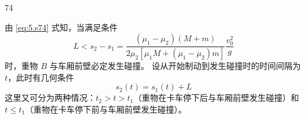 \begin{solution}{74}
\begin{subsolution}
    \end{subsolution}
    \begin{subsolution}
        由 \eqref{eq:5.s74} 式知，当满足条件
        \begin{equation}
            L < s_{2} - s_{1} = \frac{(\mu_{1} - \mu_{2})(M + m)}{2 \mu_{2} [\mu_{1} M + (\mu_{1} - \mu_{2}) m]} \frac{v_{0}^{2}}{g}
        \end{equation}
        时，重物 $B$ 与车厢前壁必定发生碰撞。
        设从开始制动到发生碰撞时的时间间隔为 $t$，此时有几何条件
        \begin{equation}
            s_{2}(t) = s_{1}(t) + L
            \label{eq:6.s74}
        \end{equation}
        这里又可分为两种情况：$t_{2}>t>t_{1}$（重物在卡车停下后与车厢前壁发生碰撞）和 $t\leq t_{1}$（重物在卡车停下前与车厢前壁发生碰撞）。


\end{subsolution}
\end{solution}
